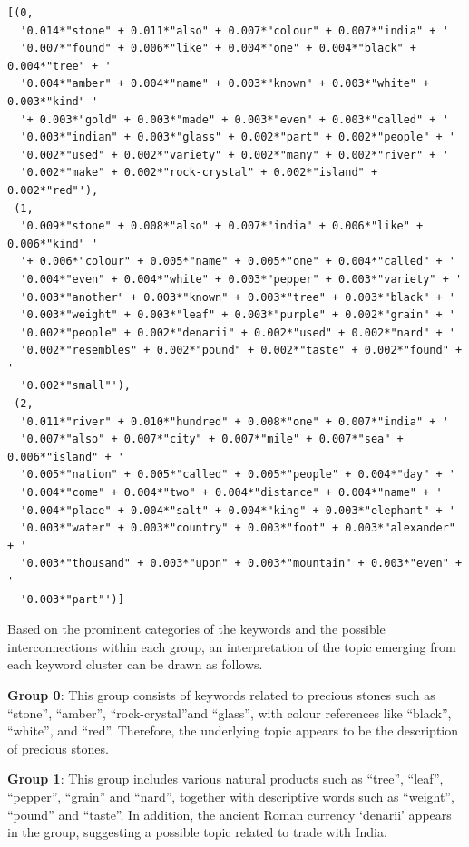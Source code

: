 \documentclass[
  12pt,
]{article}
\begin{document}
\begin{verbatim}
[(0,
  '0.014*"stone" + 0.011*"also" + 0.007*"colour" + 0.007*"india" + '
  '0.007*"found" + 0.006*"like" + 0.004*"one" + 0.004*"black" + 0.004*"tree" + '
  '0.004*"amber" + 0.004*"name" + 0.003*"known" + 0.003*"white" + 0.003*"kind" '
  '+ 0.003*"gold" + 0.003*"made" + 0.003*"even" + 0.003*"called" + '
  '0.003*"indian" + 0.003*"glass" + 0.002*"part" + 0.002*"people" + '
  '0.002*"used" + 0.002*"variety" + 0.002*"many" + 0.002*"river" + '
  '0.002*"make" + 0.002*"rock-crystal" + 0.002*"island" + 0.002*"red"'),
 (1,
  '0.009*"stone" + 0.008*"also" + 0.007*"india" + 0.006*"like" + 0.006*"kind" '
  '+ 0.006*"colour" + 0.005*"name" + 0.005*"one" + 0.004*"called" + '
  '0.004*"even" + 0.004*"white" + 0.003*"pepper" + 0.003*"variety" + '
  '0.003*"another" + 0.003*"known" + 0.003*"tree" + 0.003*"black" + '
  '0.003*"weight" + 0.003*"leaf" + 0.003*"purple" + 0.002*"grain" + '
  '0.002*"people" + 0.002*"denarii" + 0.002*"used" + 0.002*"nard" + '
  '0.002*"resembles" + 0.002*"pound" + 0.002*"taste" + 0.002*"found" + '
  '0.002*"small"'),
 (2,
  '0.011*"river" + 0.010*"hundred" + 0.008*"one" + 0.007*"india" + '
  '0.007*"also" + 0.007*"city" + 0.007*"mile" + 0.007*"sea" + 0.006*"island" + '
  '0.005*"nation" + 0.005*"called" + 0.005*"people" + 0.004*"day" + '
  '0.004*"come" + 0.004*"two" + 0.004*"distance" + 0.004*"name" + '
  '0.004*"place" + 0.004*"salt" + 0.004*"king" + 0.003*"elephant" + '
  '0.003*"water" + 0.003*"country" + 0.003*"foot" + 0.003*"alexander" + '
  '0.003*"thousand" + 0.003*"upon" + 0.003*"mountain" + 0.003*"even" + '
  '0.003*"part"')]
\end{verbatim}

Based on the prominent categories of the keywords and the possible
interconnections within each group, an interpretation of the topic
emerging from each keyword cluster can be drawn as follows.

\textbf{Group 0}: This group consists of keywords related to precious
stones such as ``stone'', ``amber'', ``rock-crystal''and ``glass'', with
colour references like ``black'', ``white'', and ``red''. Therefore, the
underlying topic appears to be the description of precious stones.

\textbf{Group 1}: This group includes various natural products such as
``tree'', ``leaf'', ``pepper'', ``grain'' and ``nard'', together with
descriptive words such as ``weight'', ``pound'' and ``taste''. In
addition, the ancient Roman currency `denarii' appears in the group,
suggesting a possible topic related to trade with India.
\end{document}
